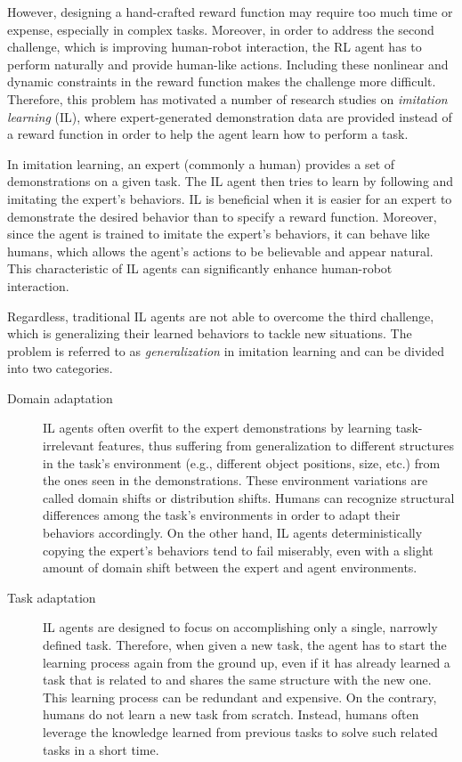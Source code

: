 However,
designing a hand-crafted reward function may require too much time or expense,
especially in complex tasks.
Moreover,
in order to address the second challenge,
which is improving human-robot interaction,
the RL agent has to perform naturally and provide human-like actions.
Including these nonlinear and dynamic constraints in the reward function makes the challenge more difficult.
Therefore,
this problem has motivated a number of research studies on \textit{imitation learning} (IL),
where expert-generated demonstration data are provided instead of a reward function in order to help the agent learn how to perform a task.

In imitation learning,
an expert (commonly a human) provides a set of demonstrations on a given task.
The IL agent then tries to learn by following and imitating the expert's behaviors.
IL is beneficial when it is easier for an expert to demonstrate the desired behavior than to specify a reward function.
Moreover,
since the agent is trained to imitate the expert's behaviors,
it can behave like humans,
which allows the agent's actions to be believable and appear natural.
This characteristic of IL agents can significantly enhance human-robot interaction.

Regardless,
traditional IL agents are not able to overcome the third challenge,
which is generalizing their learned behaviors to tackle new situations.
The problem is referred to as \textit{generalization} in imitation learning and can be divided into two categories.

\begin{description}
  \item[Domain adaptation]
        IL agents often overfit to the expert demonstrations by learning task-irrelevant features,
        thus suffering from generalization to different structures in the task's environment
        (e.g.,
        different object positions,
        size,
        etc.)
        from the ones seen in the demonstrations.
        These environment variations are called domain shifts or distribution shifts.
        Humans can recognize structural differences among the task's environments in order to adapt their behaviors accordingly.
        On the other hand,
        IL agents deterministically copying the expert's behaviors tend to fail miserably,
        even with a slight amount of domain shift between the expert and agent environments.


  \item[Task adaptation]
        IL agents are designed to focus on accomplishing only a single,
        narrowly defined task.
        Therefore,
        when given a new task,
        the agent has to start the learning process again from the ground up,
        even if it has already learned a task that is related to and shares the same structure with the new one.
        This learning process can be redundant and expensive.
        On the contrary,
        humans do not learn a new task from scratch.
        Instead,
        humans often leverage the knowledge learned from previous tasks to solve such related tasks in a short time.
\end{description}

